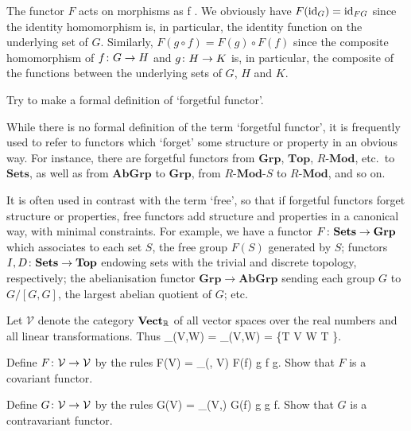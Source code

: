 \bs
The functor $F$ acts on morphisms as
\bse
f \longmapsto {}.
\ese
We obviously have $F(\mathrm{id}_G)=\mathrm{id}_{FG}$ since the identity homomorphism is, in particular, the identity function on the underlying set of $G$. Similarly, $F(g\circ f)=F(g)\circ F(f)$ since the composite homomorphism of $f\colon G\to H$ and $g\colon H\to K$ is, in particular, the composite of the functions between the underlying sets of $G$, $H$ and $K$. 
\es

\bx
Try to make a formal definition of `forgetful functor'.
\ex

\bs
While there is no formal definition of the term `forgetful functor', it is frequently used to refer to functors which `forget' some structure or property in an obvious way. For instance, there are forgetful functors from $\mathbf{Grp}$, $\mathbf{Top}$, $R$-$\mathbf{Mod}$, etc.\ to $\mathbf{Sets}$, as well as from $\mathbf{AbGrp}$ to $\mathbf{Grp}$, from $R$-$\mathbf{Mod}$-$S$ to $R$-$\mathbf{Mod}$, and so on.

It is often used in contrast with the term `free', so that if forgetful functors forget structure or properties, free functors add structure and properties in a canonical way, with minimal constraints. For example, we have a functor $F\colon \mathbf{Sets}\to\mathbf{Grp}$ which associates to each set $S$, the free group $F(S)$ generated by $S$; functors $I,D\colon \mathbf{Sets}\to\mathbf{Top}$ endowing sets with the trivial and discrete topology, respectively; the abelianisation functor $\mathbf{Grp}\to\mathbf{AbGrp}$ sending each group $G$ to $G/[G,G]$, the largest abelian quotient of $G$; etc.
\es

\bx
Let $\mathcal{V}$ denote the category $\mathbf{Vect}_{\mathbb{R}}$ of all vector spaces over the real numbers and all linear transformations. Thus
\bse
\mor_{}(V,W) = \Hom_{\R}(V,W) = \{T \cl V \to W \mid T \}.
\ese
\ben[label=(\alph*)]
\item Define $F \colon \mathcal{V} \to\mathcal{V}$ by the rules
\bse
F(V) = \Hom_{\R}(\R, V) \qquad {} \qquad F(f) \cl g 	\mapsto f \circ g.
\ese
Show that $F$ is a covariant functor.
\item Define $G \colon \mathcal{V} \to\mathcal{V}$ by the rules
\bse
G(V) = \Hom_{\R}(V,\R) \qquad {} \qquad G(f) \cl g 	\mapsto g \circ f.
\ese
Show that $G$ is a contravariant functor.
\een
\ex

